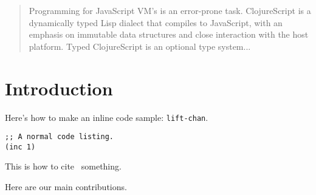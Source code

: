 \documentclass[preprint]{sigplanconf}
\begin{document}

\begin{abstract}
Programming for JavaScript VM's is an error-prone task. ClojureScript is
a dynamically typed Lisp dialect that compiles to JavaScript, with an emphasis
on immutable data structures and close interaction with the host platform.
Typed ClojureScript is an optional type system...
\end{abstract}





\section*{Introduction}


Here's how to make an inline code sample: \lstinline|lift-chan|.

\begin{lstlisting}
;; A normal code listing.
(inc 1)
\end{lstlisting}

This is how to cite~\cite{Tob10} something.


Here are our main contributions.
\end{document}
